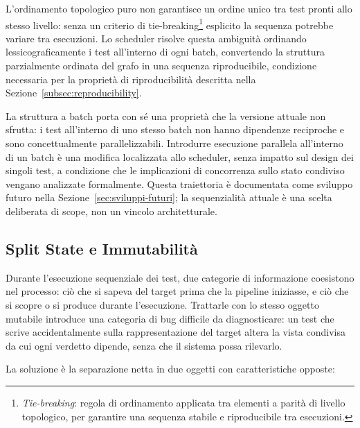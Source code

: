 L'ordinamento topologico puro non garantisce un ordine unico tra test pronti allo stesso livello: senza un criterio di tie-breaking\footnote{\textit{Tie-breaking}: regola di ordinamento applicata tra elementi a parità di livello topologico, per garantire una sequenza stabile e riproducibile tra esecuzioni.} esplicito la sequenza potrebbe variare tra esecuzioni. Lo scheduler risolve questa ambiguità ordinando lessicograficamente i test all'interno di ogni batch, convertendo la struttura parzialmente ordinata del grafo in una sequenza riproducibile, condizione necessaria per la proprietà di riproducibilità descritta nella Sezione~\ref{subsec:reproducibility}.

La struttura a batch porta con sé una proprietà che la versione attuale non sfrutta: i test all'interno di uno stesso batch non hanno dipendenze reciproche e sono concettualmente parallelizzabili. Introdurre esecuzione parallela all'interno di un batch è una modifica localizzata allo scheduler, senza impatto sul design dei singoli test, a condizione che le implicazioni di concorrenza sullo stato condiviso vengano analizzate formalmente. Questa traiettoria è documentata come sviluppo futuro nella Sezione~\ref{sec:sviluppi-futuri}; la sequenzialità attuale è una scelta deliberata di scope, non un vincolo architetturale.


\subsection{Split State e Immutabilità}\label{subsec:split-state}

Durante l'esecuzione sequenziale dei test, due categorie di informazione coesistono nel processo: ciò che si sapeva del target prima che la pipeline iniziasse, e ciò che si scopre o si produce durante l'esecuzione. Trattarle con lo stesso oggetto mutabile introduce una categoria di bug difficile da diagnosticare: un test che scrive accidentalmente sulla rappresentazione del target altera la vista condivisa da cui ogni verdetto dipende, senza che il sistema possa rilevarlo.

La soluzione è la separazione netta in due oggetti con caratteristiche opposte:

